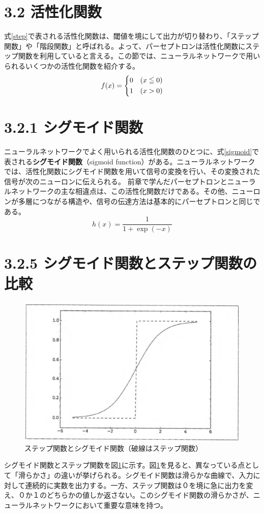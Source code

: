 \documentclass[dvipdfmx]{jsarticle}
\begin{document}
\section*{3.2 活性化関数}
式\ref{step}で表される活性化関数は、閾値を境にして出力が切り替わり、「ステップ関数」や「階段関数」と呼ばれる。よって、パーセプトロンは活性化関数にステップ関数を利用していると言える。この節では、ニューラルネットワークで用いられるいくつかの活性化関数を紹介する。
\begin{equation}\label{step}
    f(x)=
    \begin{dcases}
      0 & (x \leqq 0) \\
      1 & (x > 0)
    \end{dcases}
  \end{equation}


\section*{3.2.1 シグモイド関数}
ニューラルネットワークでよく用いられる活性化関数のひとつに、式\ref{sigmoid}で表される\textbf{シグモイド関数}（sigmoid function）がある。ニューラルネットワークでは、活性化関数にシグモイド関数を用いて信号の変換を行い、その変換された信号が次のニューロンに伝えられる。
前章で学んだパーセプトロンとニューラルネットワークの主な相違点は、この活性化関数だけである。その他、ニューロンが多層につながる構造や、信号の伝達方法は基本的にパーセプトロンと同じである。
\begin{equation}\label{sigmoid}
h(x)=\frac{1}{1 + \exp(-x)}
\end{equation}


\section*{3.2.5 シグモイド関数とステップ関数の比較}
\begin{figure}[H]\label{step_sigmoid}
\begin{center}
\includegraphics[width=0.8\linewidth]{"./spring_lec/dp_active_function.png"}
\end{center}
\caption{ステップ関数とシグモイド関数（破線はステップ関数）}
\end{figure}
シグモイド関数とステップ関数を図\ref{step_sigmoid}に示す。図\ref{step_sigmoid}を見ると、異なっている点として「滑らかさ」の違いが挙げられる。シグモイド関数は滑らかな曲線で、入力に対して連続的に実数を出力する。一方、ステップ関数は０を境に急に出力を変え、０か１のどちらかの値しか返さない。このシグモイド関数の滑らかさが、ニューラルネットワークにおいて重要な意味を持つ。
\end{document}
